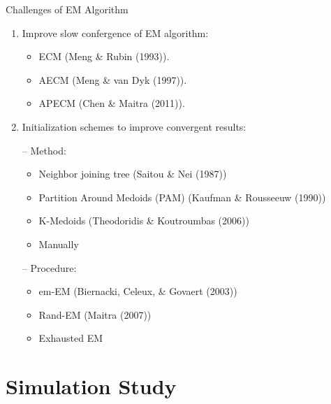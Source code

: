 \documentclass{beamer}
\begin{document}

\begin{frame}{Challenges of EM Algorithm}

\begin{enumerate}
\item Improve slow confergence of EM algorithm:
\begin{itemize}
\item ECM (Meng \& Rubin (1993)).
\item AECM (Meng \& van Dyk (1997)).
\item APECM (Chen \& Maitra (2011)).
\end{itemize}

\item Initialization schemes to improve convergent results:

-- Method:
\begin{itemize}
\item Neighbor joining tree (Saitou \& Nei (1987))
\item Partition Around Medoids (PAM) (Kaufman \& Rousseeuw (1990))
\item K-Medoids (Theodoridis \& Koutroumbas (2006))
\item Manually
\end{itemize}

-- Procedure:
\begin{itemize}
\item em-EM (Biernacki, Celeux, \& Govaert (2003))
\item Rand-EM (Maitra (2007))
\item Exhausted EM
\end{itemize}

\end{enumerate}

\end{frame}


\section{Simulation Study}
\end{document}
